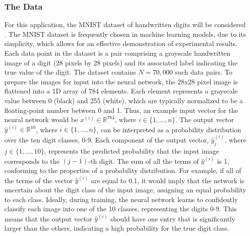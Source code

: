 \subsubsection{The Data}
For this application, the MNIST dataset of handwritten digits will be considered \cite{deng2012mnist}. The MNIST dataset is frequently chosen in machine learning models, due to its simplicity, which allows for an effective demonstration of experimental results. Each data point in the dataset is a pair comprising a grayscale handwritten image of a digit (28 pixels by 28 pixels) and its associated label indicating the true value of the digit. The dataset contains $N=70,000$ such data pairs. To prepare the images for input into the neural network, the 28x28 pixel image is flattened into a 1D array of 784 elements. Each element represents a grayscale value between 0 (black) and 255 (white), which are typically normalized to be a floating-point number between 0 and 1. Thus, an example input vector for the neural network would be $x^{(i)} \in \mathbb{R}^{784}$, where $i \in \{1,\ldots,n\}.$ The output vector $\hat{y}^{(i)} \in \mathbb{R}^{10}$, where $i \in \{1,\ldots,n\}$, can be interpreted as a probability distribution over the ten digit classes, 0-9. Each component of the output vector, $\hat{y}_{j}^{(i)}$, where $j \in \{1,\ldots,10\}$, represents the predicted probability that the input image corresponds to the $(j-1)$-th digit. The sum of all the terms of  $\hat{y}^{(i)}$ is 1, conforming to the properties of a probability distribution. For example, if all of the terms of the vector $\hat{y}^{(i)}$ are equal to 0.1, it would imply that the network is uncertain about the digit class of the input image, assigning an equal probability to each class. Ideally, during training, the neural network learns to confidently classify each image into one of the 10 classes, representing the digits 0-9. This means that the output vector $\hat{y}^{(i)}$ should have one entry that is significantly larger than the others, indicating a high probability for the true digit class.
